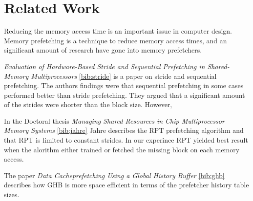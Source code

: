 \section{Related Work}
\label{sec:related-work}

Reducing the memory access time is an important issue in computer design.
Memory prefetching is a technique to reduce memory access times,
and an significant amount of research have gone into memory prefetchers.

\textit{Evaluation of Hardware-Based Stride and Sequential Prefetching in Shared-Memory Multiprocessors} \ref{bib:stride}
is a paper on stride and sequential prefetching.
The authors findings were that sequential prefetching in some cases performed better than stride prefetching.
They argued that a significant amount of the strides were shorter than the block size.
However, 

In the Doctoral thesis \textit{Managing Shared Resources in Chip Multiprocessor Memory Systems} \ref{bib:jahre}
Jahre describes the RPT prefetching algorithm and that RPT is limited to constant strides.
In our experince RPT yielded best result when the alorithm either trained or fetched the missing block on each memory access.

The paper \textit{Data Cacheprefetching Using a Global History Buffer} \ref{bib:ghb}
describes how GHB is more space efficient in terms of the prefetcher history table sizes.




